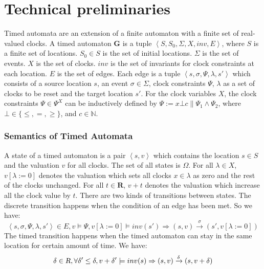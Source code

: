 \section{Technical preliminaries}
\label{preliminaries}
Timed automata \cite{timed_automata} are an extension of a finite automaton with a finite set of real-valued clocks. 
A timed automaton \textbf{G} is a tuple $\left\langle S,S_0,\Sigma,X,inv,E\right\rangle$, where
 $S$ is a finite set of locations.
 $S_0\in S$ is the set of initial locations.
 $\Sigma$ is the set of events.
$X$ is the set of clocks.
$inv$ is the set of invariants for clock constraints at each location.
 $E$ is the set of edges. Each edge is a tuple $\left\langle s,\sigma,\Psi,\lambda,s'\right\rangle$ which consists of a source location $s$, an event $\sigma\in\Sigma$, clock constraints $\Psi$, $\lambda$ as a set of clocks to be reset and the target location $s'$. For the clock variables $X$, the clock constraints $\Psi\in\Psi^X$ can be inductively defined by $\Psi:=x\bot c\|\Psi_1\wedge\Psi_2$, where $\bot\in\{\leq,=,\geq\}$, and $c\in\mathbb{N}$.
\vspace{-10pt}
\subsubsection{Semantics of Timed Automata}
A state of a timed automaton is a pair $\left\langle s,v\right\rangle$ which contains the location $s\in S$ and the valuation $v$ for all clocks. The set of all states is $\Omega$. For all $\lambda\in X$, $v[\lambda :=0]$ denotes the valuation which sets all clocks $x\in\lambda$ as zero and the rest of the clocks unchanged. For all $t\in \textbf{R}$, $v+t$ denotes the valuation which increase all the clock value by $t$. There are two kinds of transitions between states. The \textsf{discrete transition} happens when the condition of an edge has been met. So we have:
$$\left\langle s,\sigma,\Psi,\lambda,s'\right\rangle\in E,v\models \Psi,v[\lambda :=0]\models inv(s')\Rightarrow (s,v)\xrightarrow{\sigma}(s',v[\lambda :=0])$$
The \textsf{timed transition} happens when the timed automaton can stay in the same location for certain amount of time. We have:
$$\delta\in \textsl{R},\forall \delta'\leq\delta, v+\delta'\models inv(s)\Rightarrow (s,v)\xrightarrow{\delta}(s,v+\delta)$$
\vspace{-15pt}
